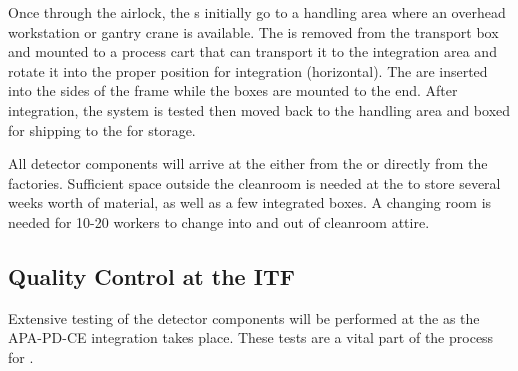 Once through the airlock,  the s initially go to a handling area where an overhead workstation or gantry crane is available. The  is removed from the transport box and mounted to a process cart that can transport it to the integration area and rotate it into the proper position for integration (horizontal). The  are inserted into the sides of the  frame while the  boxes are mounted to the end. After integration, the system is tested then moved back to the handling area and boxed for shipping to the  for storage.  

All detector  components will arrive at the  either from the  or directly from the factories. Sufficient space outside the cleanroom is needed at the  to store several weeks worth of material, as well as a few integrated  boxes. A changing room is needed for 10-20 workers to change into and out of cleanroom attire.  

\subsection{Quality Control at the ITF}
\label{sec:fdsp-tc-itf-qaqc}
Extensive testing of the detector components will be performed at the  as the APA-PD-CE integration takes place. These tests are a vital part of the  process for . %

